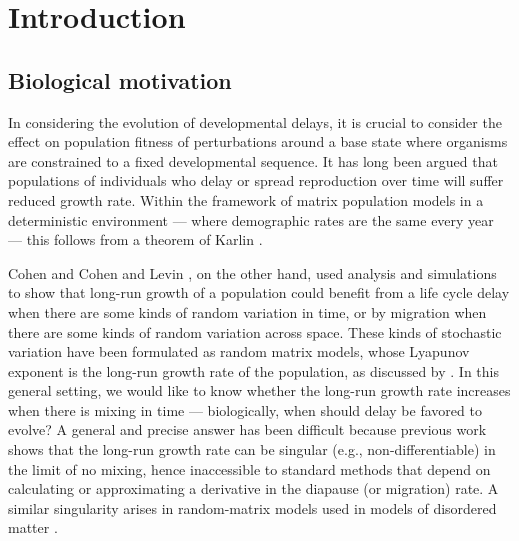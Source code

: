 \documentclass[11pt]{amsart}
\begin{document}
\section{Introduction}
\subsection{Biological motivation}
In considering the evolution of developmental delays, it is crucial to consider the effect on population fitness of perturbations around a base state where organisms
are constrained to a fixed developmental sequence.
It has long been argued \cite{cole1954pcl} that populations of individuals who delay or spread reproduction over time will suffer reduced growth rate. Within the framework of matrix population models in a deterministic environment --- where demographic rates are the same every year --- this follows from a theorem of Karlin \cite{karlin82}.

Cohen \cite{cohen1966} and Cohen and Levin \cite{cohen1991}, on the other hand, used analysis and simulations to show that long-run growth of a population could benefit from a life cycle delay when there are some kinds of random variation in time, or by migration when there are some kinds of random variation across space. 
These kinds of stochastic variation have been formulated as random matrix models, whose Lyapunov exponent is the long-run growth rate of the population, as discussed by \cite{sT90delayed,tuljapurkar2000ets, Wiener1994}. In this general setting, we would like to know whether the long-run growth rate increases when there is mixing in time \cite{tuljapurkar2000ets} --- biologically, when should delay be favored to evolve? 
A general and precise answer has been difficult because previous work \cite{Wiener1994} shows that the long-run growth rate can be singular (e.g., non-differentiable) in the limit of no mixing, hence inaccessible to standard methods that depend on calculating or approximating a derivative in the diapause (or migration) rate. 
A similar singularity arises in random-matrix models used in models of disordered matter \cite{derrida1983singular}. 
\end{document}
